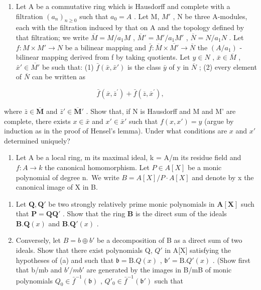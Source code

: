 
\begin{enumerate}
\def\labelenumi{\arabic{enumi}.}
\tightlist
\item
  Let A be a commutative ring which is Hausdorff and complete with a filtration \((a_{n})_{n\geq0}\) such that \(a_{0}=A\) . Let M, \(M'\) , N be three A-modules, each with the filtration induced by that on A and the topology defined by that filtration; we write \(\overline{M}=M/a_{1}M\) , \(\overline{M}'=M'/a_{1}M'\) , \(\overline{N}=N/a_{1}N\) . Let \(f: M\times M'\to N\) be a bilinear mapping and \(\bar{f}: \overline{M}\times\overline{M'}\to\overline{N}\) the \((A/a_{1})\) -bilinear mapping derived from f by taking quotients. Let \(y\in N\) , \(\bar{x}\in\overline{M}\) , \(\bar{x}'\in\overline{M'}\) be such that: (1) \(\bar{f}(\bar{x},\bar{x}')\) is the class \(\bar{y}\) of y in \(\overline{N}\) ; (2) every element of \(\overline{N}\) can be written as
\end{enumerate}

\[
\bar {f} (\overline {{{x}}}, \overline {{{z}}} ^ {\prime}) + \bar {f} (\overline {{{z}}}, \overline {{{x}}} ^ {\prime}),
\]

where \(\bar{z} \in \overline{\mathbf{M}}\) and \(\bar{z}' \in \overline{\mathbf{M}}'\) . Show that, if N is Hausdorff and M and M' are complete, there exists \(x \in \bar{x}\) and \(x' \in \bar{x}'\) such that \(f(x, x') = y\) (argue by induction as in the proof of Hensel's lemma). Under what conditions are \(x\) and \(x'\) determined uniquely?

\begin{enumerate}
\def\labelenumi{\arabic{enumi}.}
\setcounter{enumi}{1}
\tightlist
\item
  Let A be a local ring, m its maximal ideal, k = A/m its residue field and \(f: A \to k\) the canonical homomorphism. Let \(P \in A[X]\) be a monic polynomial of degree n.~We write \(B = A[X]/P \cdot A[X]\) and denote by x the canonical image of X in B.
\end{enumerate}

\begin{enumerate}
\def\labelenumi{(\alph{enumi})}
\item
  Let \(\mathbf{Q}, \mathbf{Q}'\) be two strongly relatively prime monic polynomials in \(\mathbf{A}[\mathbf{X}]\) such that \(\mathbf{P} = \mathbf{QQ}'\) . Show that the ring \(\mathbf{B}\) is the direct sum of the ideals \(\mathbf{B}. \mathbf{Q}(x)\) and \(\mathbf{B}. \mathbf{Q}'(x)\) .
\item
  Conversely, let \(B = b \oplus b'\) be a decomposition of B as a direct sum of two ideals. Show that there exist polynomials Q, \(Q'\) in A{[}X{]} satisfying the hypotheses of (a) and such that \(\mathfrak{b} = \mathrm{B}.Q(x)\) , \(\mathfrak{b}' = \mathrm{B}.Q'(x)\) . (Show first that b/mb and \(b'/mb'\) are generated by the images in B/mB of monic polynomials \(Q_{0} \in \bar{f}^{-1}(\mathfrak{b})\) , \(Q'_{0} \in \bar{f}^{-1}(\mathfrak{b}')\) such that
\end{enumerate}

